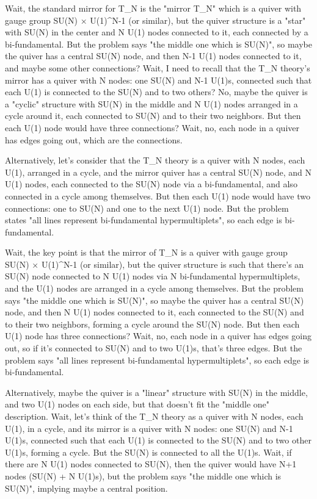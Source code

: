 Wait, the standard mirror for T_N is the "mirror T_N" which is a quiver with gauge group SU(N) × U(1)^{N-1} (or similar), but the quiver structure is a "star" with SU(N) in the center and N U(1) nodes connected to it, each connected by a bi-fundamental. But the problem says "the middle one which is SU(N)", so maybe the quiver has a central SU(N) node, and then N-1 U(1) nodes connected to it, and maybe some other connections? Wait, I need to recall that the T_N theory's mirror has a quiver with N nodes: one SU(N) and N-1 U(1)s, connected such that each U(1) is connected to the SU(N) and to two others? No, maybe the quiver is a "cyclic" structure with SU(N) in the middle and N U(1) nodes arranged in a cycle around it, each connected to SU(N) and to their two neighbors. But then each U(1) node would have three connections? Wait, no, each node in a quiver has edges going out, which are the connections. 

Alternatively, let's consider that the T_N theory is a quiver with N nodes, each U(1), arranged in a cycle, and the mirror quiver has a central SU(N) node, and N U(1) nodes, each connected to the SU(N) node via a bi-fundamental, and also connected in a cycle among themselves. But then each U(1) node would have two connections: one to SU(N) and one to the next U(1) node. But the problem states "all lines represent bi-fundamental hypermultiplets", so each edge is bi-fundamental. 

Wait, the key point is that the mirror of T_N is a quiver with gauge group SU(N) × U(1)^{N-1} (or similar), but the quiver structure is such that there's an SU(N) node connected to N U(1) nodes via N bi-fundamental hypermultiplets, and the U(1) nodes are arranged in a cycle among themselves. But the problem says "the middle one which is SU(N)", so maybe the quiver has a central SU(N) node, and then N U(1) nodes connected to it, each connected to the SU(N) and to their two neighbors, forming a cycle around the SU(N) node. But then each U(1) node has three connections? Wait, no, each node in a quiver has edges going out, so if it's connected to SU(N) and to two U(1)s, that's three edges. But the problem says "all lines represent bi-fundamental hypermultiplets", so each edge is bi-fundamental. 

Alternatively, maybe the quiver is a "linear" structure with SU(N) in the middle, and two U(1) nodes on each side, but that doesn't fit the "middle one" description. Wait, let's think of the T_N theory as a quiver with N nodes, each U(1), in a cycle, and its mirror is a quiver with N nodes: one SU(N) and N-1 U(1)s, connected such that each U(1) is connected to the SU(N) and to two other U(1)s, forming a cycle. But the SU(N) is connected to all the U(1)s. Wait, if there are N U(1) nodes connected to SU(N), then the quiver would have N+1 nodes (SU(N) + N U(1)s), but the problem says "the middle one which is SU(N)", implying maybe a central position. 

